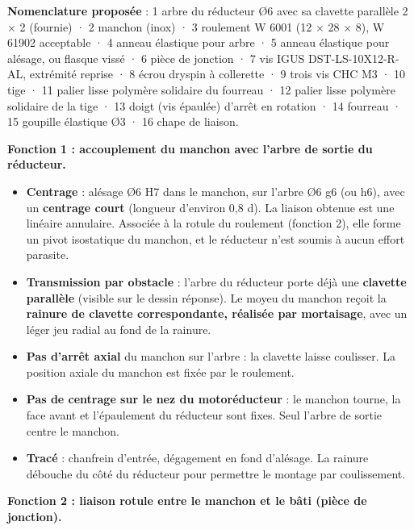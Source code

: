 \documentclass[11pt,a4paper]{article}
\providecommand{\tightlist}{\setlength{\itemsep}{0pt}\setlength{\parskip}{0pt}}
\begin{document}
\textbf{Nomenclature proposée} : 1 arbre du réducteur Ø6 avec sa clavette parallèle 2 × 2 (fournie) · 2 manchon (inox) · 3 roulement W 6001 (12 × 28 × 8), W 61902 acceptable · 4 anneau élastique pour arbre · 5 anneau élastique pour alésage, ou flasque vissé · 6 pièce de jonction · 7 vis IGUS DST-LS-10X12-R-AL, extrémité reprise · 8 écrou dryspin à collerette · 9 trois vis CHC M3 · 10 tige · 11 palier lisse polymère solidaire du fourreau · 12 palier lisse polymère solidaire de la tige · 13 doigt (vis épaulée) d'arrêt en rotation · 14 fourreau · 15 goupille élastique Ø3 · 16 chape de liaison.

\textbf{Fonction 1 : accouplement du manchon avec l'arbre de sortie du réducteur.}

\begin{itemize}
\tightlist
\item
  \textbf{Centrage} : alésage Ø6 H7 dans le manchon, sur l'arbre Ø6 g6 (ou h6), avec un \textbf{centrage court} (longueur d'environ 0,8 d). La liaison obtenue est une linéaire annulaire. Associée à la rotule du roulement (fonction 2), elle forme un pivot isostatique du manchon, et le réducteur n'est soumis à aucun effort parasite.
\item
  \textbf{Transmission par obstacle} : l'arbre du réducteur porte déjà une \textbf{clavette parallèle} (visible sur le dessin réponse). Le moyeu du manchon reçoit la \textbf{rainure de clavette correspondante, réalisée par mortaisage}, avec un léger jeu radial au fond de la rainure.
\item
  \textbf{Pas d'arrêt axial} du manchon sur l'arbre : la clavette laisse coulisser. La position axiale du manchon est fixée par le roulement.
\item
  \textbf{Pas de centrage sur le nez du motoréducteur} : le manchon tourne, la face avant et l'épaulement du réducteur sont fixes. Seul l'arbre de sortie centre le manchon.
\item
  \textbf{Tracé} : chanfrein d'entrée, dégagement en fond d'alésage. La rainure débouche du côté du réducteur pour permettre le montage par coulissement.
\end{itemize}

\textbf{Fonction 2 : liaison rotule entre le manchon et le bâti (pièce de jonction).}
\end{document}
